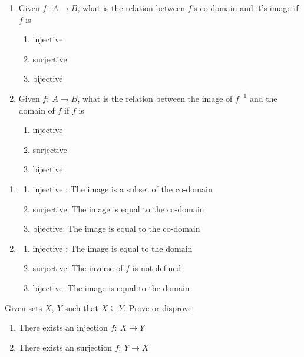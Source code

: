 \documentclass[12pt]{article}
\newenvironment{solution}[2][Solution]{ \begin{trivlist}
\item[\hskip \labelsep {\bfseries #1}]}{\end{trivlist}}
\newenvironment{problem}[2][Problem]{\begin{trivlist}
\item[\hskip \labelsep {\bfseries #1}\hskip \labelsep {\bfseries #2.}]}{\end{trivlist}}
\begin{document}
\begin{problem}{3}
\item[]
\begin{enumerate}[label=\alph*)]
    \item Given $ f \colon \ A \longrightarrow B$, what is the relation between $f$'s co-domain and it's image if $f$ is
    \begin{enumerate}[label=(\roman*)]
    \item injective
    \item surjective
    \item bijective
    \end{enumerate}
    \item Given $ f \colon \ A \longrightarrow B$, what is the relation between the image of $f^{-1}$ and the domain of $f$ if $f$ is
    \begin{enumerate}[label=(\roman*)]
    \item injective
    \item surjective
    \item bijective
    \end{enumerate}
\end{enumerate}
\end{problem}
\begin{solution}{3}
\item[]
\begin{enumerate}[label=\alph*)]
\item
    \begin{enumerate}[label=(\roman*)]
        \item injective : The image is a subset of the co-domain
        \item surjective: The image is equal to the co-domain
        \item bijective: The image is equal to the co-domain
        \end{enumerate}
\item
    \begin{enumerate}[label=(\roman*)]
        \item injective : The image is equal to the domain
        \item surjective: The inverse of $f$ is not defined
        \item bijective: The image is equal to the domain
        \end{enumerate}
\end{enumerate}
\end{solution}
\vskip 0.5in
\begin{problem}{4} Given sets $X,\ Y$ such that $X \subseteq Y$. Prove or disprove:
\begin{enumerate}[label=\alph*)]
    \item There exists an injection $ f \colon \ X \longrightarrow Y$
    \item There exists an surjection $ f \colon \ Y \longrightarrow X$
\end{enumerate}
\end{problem}
\end{document}
